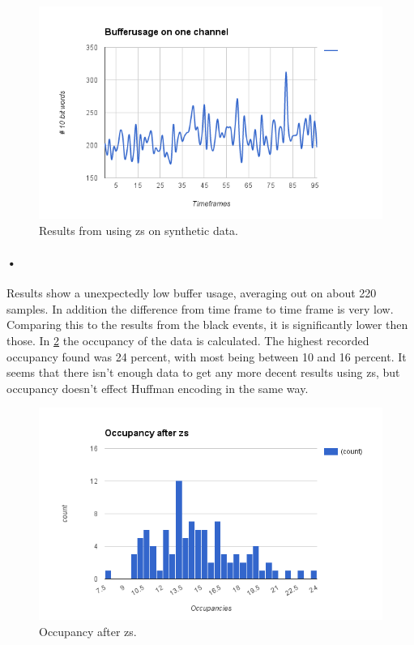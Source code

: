 \documentclass[a4paper, 12pt]{report}\dfrac{\right }{•}
\begin{document}
\begin{figure}[h!]
	\centering
		\includegraphics[width=1.0\textwidth]{images/bufferuse-one-channel-fake-pileup.png}
		\caption{Results from using \gls{zs} on synthetic data.}
		\label{fig:synthetic-zs}
\end{figure}

\paragraph{•}
Results show a unexpectedly low buffer usage, averaging out on about 220 samples.
In addition the difference from time frame to time frame is very low.
Comparing this to the results from the black events, it is significantly lower then those.
In \ref{fig:occ-synt-zs} the occupancy of the data is calculated.
The highest recorded occupancy found was 24 percent, with most being between 10 and 16 percent.
It seems that there isn't enough data to get any more decent results using \gls{zs}, but occupancy doesn't effect Huffman encoding in the same way.

\begin{figure}[h!]
	\centering
		\includegraphics[width=1.0\textwidth]{images/occ-after-zs.png}
		\caption{Occupancy after \gls{zs}.}
		\label{fig:occ-synt-zs}
\end{figure}
\end{document}
